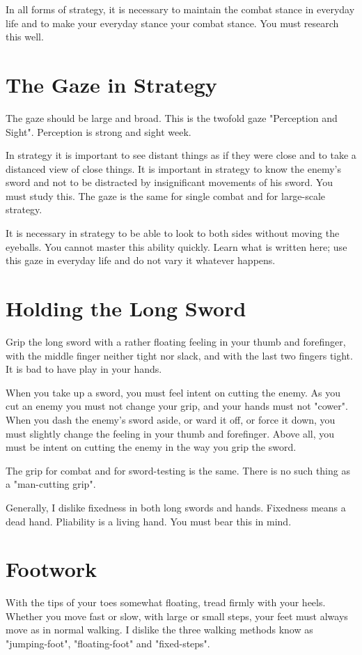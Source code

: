 \documentclass[12pt]{report}
\begin{document}
In all forms of strategy, it is necessary to maintain the combat stance in everyday life and to make your everyday stance your combat stance. You must research this well.
\section*{The Gaze in Strategy}
The gaze should be large and broad. This is the twofold gaze "Perception and Sight". Perception is strong and sight week.

In strategy it is important to see distant things as if they were close and to take a distanced view of close things. It is important in strategy to know the enemy's sword and not to be distracted by insignificant movements of his sword. You must study this. The gaze is the same for single combat and for large-scale strategy.

It is necessary in strategy to be able to look to both sides without moving the eyeballs. You cannot master this ability quickly. Learn what is written here; use this gaze in everyday life and do not vary it whatever happens.
\section*{Holding the Long Sword}
Grip the long sword with a rather floating feeling in your thumb and forefinger, with the middle finger neither tight nor slack, and with the last two fingers tight. It is bad to have play in your hands.

When you take up a sword, you must feel intent on cutting the enemy. As you cut an enemy you must not change your grip, and your hands must not "cower". When you dash the enemy's sword aside, or ward it off, or force it down, you must slightly change the feeling in your thumb and forefinger. Above all, you must be intent on cutting the enemy in the way you grip the sword.

The grip for combat and for sword-testing is the same. There is no such thing as a "man-cutting grip".

Generally, I dislike fixedness in both long swords and hands. Fixedness means a dead hand. Pliability is a living hand. You must bear this in mind.
\section*{Footwork}
With the tips of your toes somewhat floating, tread firmly with your heels. Whether you move fast or slow, with large or small steps, your feet must always move as in normal walking. I dislike the three walking methods know as "jumping-foot", "floating-foot" and "fixed-steps".
\end{document}
